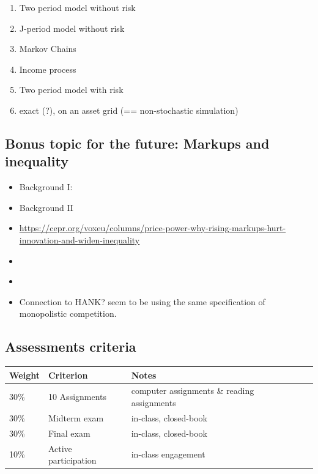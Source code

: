 \documentclass[a4paper, 11pt]{article}
\begin{document}
\begin{enumerate}
  \item Two period model without risk
  \item J-period model without risk
  \item Markov Chains
  \item Income process
  \item Two period model with risk
  \item exact (?), on an asset grid (== non-stochastic simulation)
\end{enumerate}

\subsection*{Bonus topic for the future: Markups and inequality}

\begin{itemize}
  \item Background I: \citet[JEP]{syverson2019macroeconomics}
  \item Background II \citet[QJE]{deloecker2020market-power}
  \item \url{https://cepr.org/voxeu/columns/price-power-why-rising-markups-hurt-innovation-and-widen-inequality}
  \item \citet[R\&R JEEA]{auray2026unpacking}
  \item \citet[R\&R REStud]{boar2024markups}
  \item Connection to HANK? \citet{auray2026unpacking} seem to be using the same specification of monopolistic competition.
\end{itemize}


\subsection*{Assessments criteria}

\begin{tabular}{llll}
\toprule
Weight & Criterion & Notes & \\
\midrule
30\% & 10 Assignments  & computer assignments \& reading assignments \\
30\% & Midterm exam & in-class, closed-book \\
30\% & Final exam   & in-class, closed-book \\ 
10\% & Active participation & in-class engagement \\
\bottomrule
\end{tabular}
\end{document}
